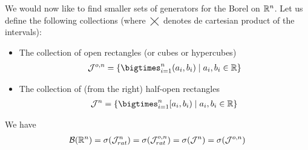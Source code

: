 We would now like to find smaller sets of generators for the Borel \siga on $\mathbb{R}^n$. Let us define the following collections (where $\bigtimes$ denotes de cartesian product of the intervals):


\begin{itemize}
	\item The collection of open rectangles (or cubes or hypercubes)
	\begin{align*}
		\calJ^{o,n} = \{\bigtimes_{i = 1}^n (a_i, b_i) \mid a_i, b_i \in \R\}
	\end{align*}
	\item The collection of (from the right) half-open rectangles
	\begin{align*}
		\calJ^{n} = \{\bigtimes_{i = 1}^n [a_i, b_i) \mid a_i, b_i \in \R\}
	\end{align*}
\end{itemize}

\begin{thm}
	\label{thm:borel-interval-generators}
	We have
	\begin{align*}
		\mathcal{B}(\mathbb{R}^n) = \sigma(\mathcal{J}_{rat}^n) = \sigma(\mathcal{J}_{rat}^{o,n}) = \sigma(\mathcal{J}^n) = \sigma(\mathcal{J}^{o,n})
	\end{align*}
\end{thm}

